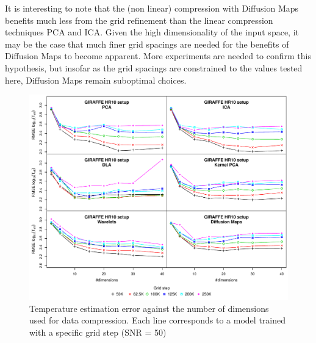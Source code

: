 \documentclass[a4paper,fleqn,usenatbib]{mnras}
\begin{document}
{{{It is interesting to note that the (non linear) compression with 
Diffusion Maps benefits much less from the grid refinement than the 
linear compression techniques PCA and ICA. Given the high dimensionality 
of the input space, it may be the case that much finer grid spacings 
are needed for the benefits of Diffusion Maps to become apparent. More 
experiments are needed to confirm this hypothesis, but insofar as the 
grid spacings are constrained to the values tested here, Diffusion Maps 
remain suboptimal choices.

\begin{figure}
\centering\includegraphics[width=\textwidth]{bestSVM_Teff_N-RMSE_HR10_snr=50_all.pdf}
\caption{Temperature estimation error against the number of dimensions
  used for data compression. Each line corresponds to a model trained
  with a specific grid step (SNR = 50)}
\label{fig:grid50}
\end{figure}

}}}
\end{document}
